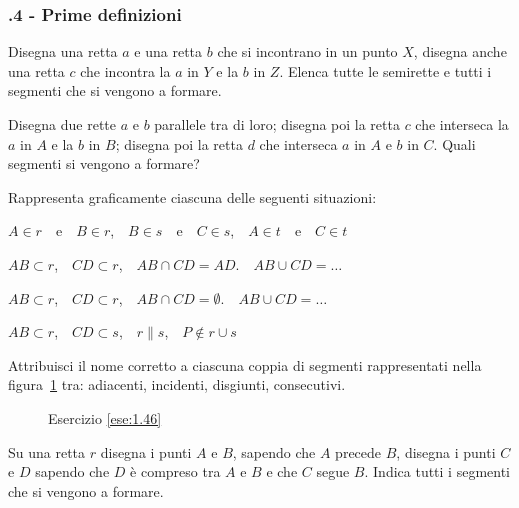 \subsubsection*{\thechapter.4 - Prime definizioni}

\begin{esercizio}
\label{ese:1.43}
Disegna una retta $a$ e una retta $b$ che si incontrano in un punto $X$, disegna anche una retta $c$ che incontra la $a$ in $Y$ e la $b$ in $Z$. Elenca tutte le semirette e tutti i segmenti che si vengono a formare.
\end{esercizio}

\begin{esercizio}
\label{ese:1.44}
Disegna due rette $a$ e $b$ parallele tra di loro; disegna poi la retta $c$ che interseca la $a$ in $A$ e la $b$ in $B$; disegna poi la retta $d$ che interseca $a$ in $A$ e $b$ in $C$. Quali segmenti si vengono a formare?
\end{esercizio}

\begin{esercizio}
\label{ese:1.45}
Rappresenta graficamente ciascuna delle seguenti situazioni:
\begin{enumeratea}
\item $A\in r$~~e~~$B\in r$,~~$B\in s$~~e~~$C\in s$,~~$A\in t$~~e~~$C\in t$
\item $AB\subset r$,~~$CD\subset r$,~~$AB\cap CD=AD$.~~$AB\cup CD=\ldots{}$
\item $AB\subset r$,~~$CD\subset r$,~~$AB\cap CD=\emptyset$.~~$AB\cup CD=\ldots{}$
\item $AB\subset r$,~~$CD\subset s$,~~$r\parallel s$,~~$P\notin r\cup s$
\end{enumeratea}
\end{esercizio}

\begin{esercizio}
\label{ese:1.46}
Attribuisci il nome corretto a ciascuna coppia di segmenti rappresentati nella figura~\ref{fig:ese1.46} tra: adiacenti, incidenti, disgiunti, consecutivi.
\end{esercizio}

\begin{figure}[htb]
 \centering
 \caption{Esercizio \ref{ese:1.46}}\label{fig:ese1.46}
\end{figure}

\begin{esercizio}
\label{ese:1.47}
Su una retta $r$ disegna i punti $A$ e $B$, sapendo che $A$ precede $B$, disegna i punti $C$ e $D$ sapendo che $D$ è compreso tra $A$ e $B$ e che $C$ segue $B$. Indica tutti i segmenti che si vengono a formare.
\end{esercizio}

